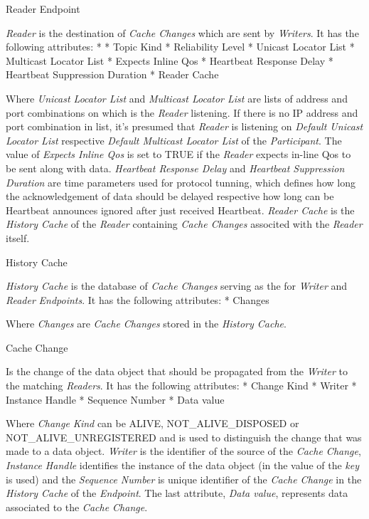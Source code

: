 \secc Reader Endpoint

{\em Reader} is the destination of {\em Cache Changes} which are sent by {\em Writers}. It has the following attributes:
\begitems
* 
* Topic Kind
* Reliability Level
* Unicast Locator List
* Multicast Locator List
* Expects Inline Qos
* Heartbeat Response Delay
* Heartbeat Suppression Duration
* Reader Cache
\enditems

Where {\em Unicast Locator List} and {\em Multicast Locator List} are lists of  address and port combinations on which is the {\em Reader} listening. If there is no IP address and port combination in list, it's presumed that {\em Reader} is listening on {\em Default Unicast Locator List} respective {\em Default Multicast Locator List} of the {\em Participant}. The value of {\em Expects Inline Qos} is set to TRUE if the {\em Reader} expects in-line Qos to be sent along with data. {\em Heartbeat Response Delay} and {\em Heartbeat Suppression Duration} are time parameters used for protocol tunning, which defines how long the acknowledgement of data should be delayed respective how long can be Heartbeat announces ignored after just received Heartbeat. {\em Reader Cache} is the {\em History Cache} of the {\em Reader} containing {\em Cache Changes} associted with the {\em Reader} itself.

\secc History Cache

{\em History Cache} is the database of {\em Cache Changes} serving as the  for {\em Writer} and {\em Reader} {\em Endpoints}. It has the following attributes:
\begitems
* Changes
\enditems

Where {\em Changes} are {\em Cache Changes} stored in the {\em History Cache}.

\secc Cache Change

Is the change of the data object that should be propagated from the {\em Writer} to the matching {\em Readers}. It has the following attributes:
\begitems
* Change Kind
* Writer 
* Instance Handle
* Sequence Number
* Data value
\enditems

Where {\em Change Kind} can be ALIVE, NOT\_ALIVE\_DISPOSED or NOT\_ALIVE\_UNREGISTERED and is used to distinguish the change that was made to a data object. {\em Writer } is the identifier of the source of the {\em Cache Change}, {\em Instance Handle} identifies the instance of the data object (in  the value of the {\em key} is used) and the {\em Sequence Number} is unique identifier of the {\em Cache Change} in the {\em History Cache} of the {\em Endpoint}. The last attribute, {\em Data value}, represents data associated to the {\em Cache Change}.

